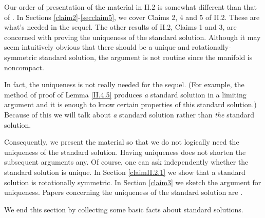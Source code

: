 \documentclass[12pt]{amsart}
\numberwithin{equation}{section}
\theoremstyle{plain}
\theoremstyle{definition}
\theoremstyle{remark}
\begin{document}
Our order of presentation of the material in 
II.2 is somewhat different than that of \cite{Perelman2}. 
In Sections \ref{claim2}-\ref{secclaim5}, we 
cover Claims 2, 4 and 5 of II.2. These are what's needed in the
sequel.  The other results of II.2, Claims 1 and 3, are concerned with proving the
uniqueness of the standard solution. Although it may seem
intuitively obvious that there should be a unique and
rotationally-symmetric standard solution, the argument
is not routine since the manifold is noncompact.

In fact, the uniqueness
is not really needed for the sequel. (For example, the method of proof of
Lemma \ref{II.4.5} produces {\em a} standard solution in a
limiting argument and it is enough to know certain properties
of this standard solution.) Because of this we will talk
about {\em a} standard solution rather than {\em the}
standard solution.

Consequently, we present the material so that we do not logically
need the uniqueness of the standard solution.
Having uniqueness does not
shorten the subsequent arguments any.
Of course, one can ask independently whether the standard
solution is unique. In Section \ref{claimII.2.1} we
show that a standard solution is rotationally symmetric.
In Section \ref{claim3} we sketch the argument for uniqueness.
Papers concerning the uniqueness of the standard solution are
\cite{Chen-Zhu,Lu-Tian}.

We end this section by collecting some basic facts about standard solutions.
\end{document}
